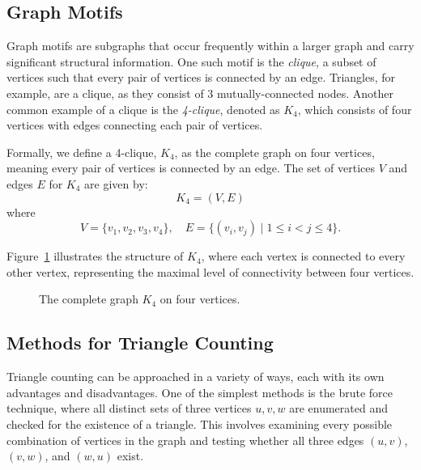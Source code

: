 \documentclass[11pt]{article}
\begin{document}
\subsection{Graph Motifs}

Graph motifs are subgraphs that occur frequently within a larger graph and carry significant structural information.
One such motif is the \emph{clique}, a subset of vertices such that every pair of vertices is connected by an edge.
Triangles, for example, are a clique, as they consist of 3 mutually-connected nodes.
Another common example of a clique is the \emph{4-clique}, denoted as \( K_4 \), which consists of four vertices with edges connecting each pair of vertices.

Formally, we define a 4-clique, \( K_4 \), as the complete graph on four vertices, meaning every pair of vertices is connected by an edge. The set of vertices \( V \) and edges \( E \) for \( K_4 \) are given by:
\[
K_4 = (V, E)
\]
where  
\[
V = \{ v_1, v_2, v_3, v_4 \}, \quad
E = \{ (v_i, v_j) \mid 1 \leq i < j \leq 4 \}.
\]

Figure~\ref{fig:k4} illustrates the structure of \( K_4 \), where each vertex is connected to every other vertex, representing the maximal level of connectivity between four vertices.

\begin{figure}[h]
    \centering
    \caption{The complete graph \( K_4 \) on four vertices.}
    \label{fig:k4}
\end{figure}

\subsection{Methods for Triangle Counting}

Triangle counting can be approached in a variety of ways, each with its own advantages and disadvantages. 
One of the simplest methods is the brute force technique, where all distinct sets of three vertices ${u, v, w}$ are enumerated and checked for the existence of a triangle.
This involves examining every possible combination of vertices in the graph and testing whether all three edges $(u, v)$, $(v, w)$, and $(w, u)$ exist. 
\end{document}
